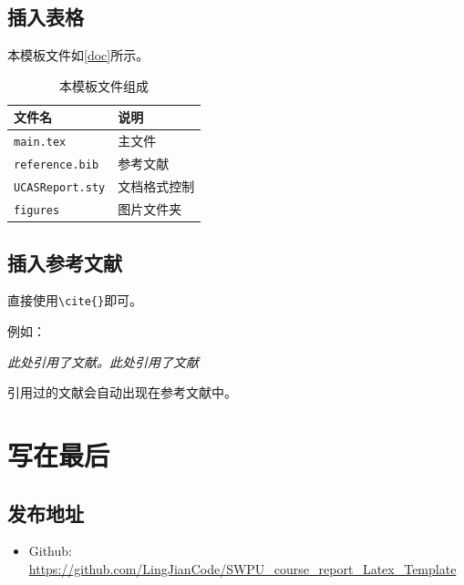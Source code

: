 \documentclass[12pt,hyperref,a4paper,UTF8]{ctexart}
\begin{document}
\subsection{插入表格}
本模板文件如\autoref{doc}所示。
\begin{table}[!htbp]
    \centering
    \begin{tabular}{l  | l}
    \hline
        文件名 & 说明 \\
        \hline
        \texttt{main.tex}  & 主文件 \\
        \texttt{reference.bib} & 参考文献 \\
        \texttt{UCASReport.sty}  & 文档格式控制\\
        \texttt{figures}  & 图片文件夹 \\
        \hline
    \end{tabular}
    \caption{本模板文件组成}
    \label{doc}
\end{table}

%
%
%
%
%
%

\subsection{插入参考文献}
直接使用\verb|\cite{}|即可。

例如：


   \textit{ 此处引用了文献\cite{0Isaac}。此处引用了文献\cite{2016The}}


引用过的文献会自动出现在参考文献中。

\section{写在最后}
\subsection{发布地址}
\begin{itemize}
    \item Github: \url{https://github.com/LingJianCode/SWPU_course_report_Latex_Template}
\end{itemize}


\end{document}
